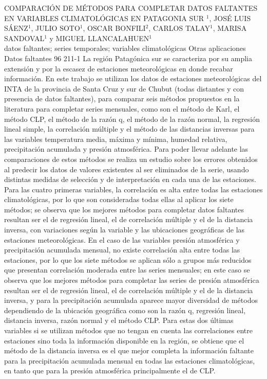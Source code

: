 \A
{COMPARACIÓN DE MÉTODOS PARA COMPLETAR DATOS FALTANTES EN VARIABLES CLIMATOLÓGICAS EN PATAGONIA SUR}
{$^1$, JOSÉ LUIS SÁENZ$^1$, JULIO SOTO$^1$, OSCAR BONFILI$^2$, CARLOS TALAY$^1$, MARISA SANDOVAL$^1$ y MIGUEL LLANCALAHUEN$^1$}
{
\\}
{datos faltantes; series temporales; variables climatológicas} 
 {Otras aplicaciones} 
 {Datos faltantes} 
 {96} 
 {211-1}
{La región Patagónica sur se caracteriza por su amplia extensión y por la escasez de estaciones meteorológicas en donde recabar información. En este trabajo se utilizan los datos de estaciones meteorológicas del INTA de la provincia de Santa Cruz y sur de Chubut (todas distantes y con presencia de datos faltantes), para comparar seis métodos propuestos en la literatura para completar series mensuales, como son el método de Karl, el método CLP, el método de la razón q, el método de la razón normal, la regresión lineal simple, la correlación múltiple y el método de las distancias inversas para las variables temperatura media, máxima y mínima, humedad relativa, precipitación acumulada y presión atmosférica. Para poder llevar adelante las comparaciones de estos métodos se realiza un estudio sobre los errores obtenidos al predecir los datos de valores existentes al ser eliminados de la serie, usando distintas medidas de selección y de interpretación en cada una de las estaciones. Para las cuatro primeras variables, la correlación es alta entre todas las estaciones climatológicas, por lo que son consideradas todas ellas al aplicar los siete métodos; se observa que los mejores métodos para completar datos faltantes resultan ser el de regresión lineal, el de correlación múltiple y el de la distancia inversa, con variaciones según la variable y las ubicaciones geográficas de las estaciones meteorológicas. En el caso de las variables presión atmosférica y precipitación acumulada mensual, no existe correlación alta entre todas las estaciones, por lo que los siete métodos se aplican sólo a grupos más reducidos que presentan correlación moderada entre las series mensuales; en este caso se observa que los mejores métodos para completar las series de presión atmosférica resultan ser el de regresión lineal, el de correlación múltiple y el de la distancia inversa, y para la precipitación acumulada aparece mayor diversidad de métodos dependiendo de la ubicación geográfica como son la razón q, regresión lineal, distancia inversa, razón normal y el método CLP. Para estas dos últimas variables si se utilizan métodos que no tengan en cuenta las correlaciones entre estaciones sino toda la información disponible en la región, se obtiene que el método de la distancia inversa es el que mejor completa la información faltante para la precipitación acumulada mensual en todas las estaciones climatológicas, en tanto que para la presión atmosférica principalmente el de CLP.}
